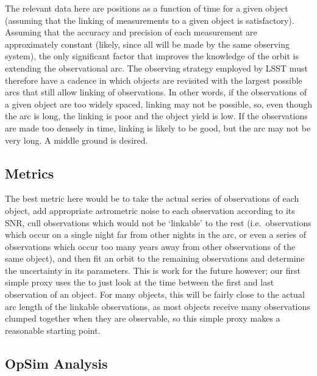 The relevant data here are positions as a function of time for a given
object (assuming that the linking of measurements to a given object is
satisfactory). Assuming that the accuracy and precision of each
measurement are approximately constant (likely, since all will be made
by the same observing system), the only significant factor that improves
the knowledge of the orbit is extending the observational arc. The
observing strategy employed by LSST must therefore have a cadence in
which objects are revisited with the largest possible arcs that still
allow linking of observations. In other words, if the observations of a
given object are too widely spaced, linking may not be possible, so,
even though the arc is long, the linking is poor and the object yield is
low. If the observations are made too densely in time, linking is likely
to be good, but the arc may not be very long. A middle ground is
desired.


\subsection{Metrics}
\label{sec:\secname:metrics}

The best metric here would be to take the actual series of observations
of each object, add appropriate astrometric noise to each observation
according to its SNR, cull observations which would not be `linkable' to
the rest (i.e.\ observations which occur on a single night far from other
nights in the arc, or even a series of observations which occur too many
years away from other observations of the same object), and then fit an
orbit to the remaining observations and determine the uncertainty in its
parameters. This is work for the future however; our first simple proxy
uses the  to just look at the time between the first
and last observation of an object. For many objects, this will be fairly
close to the actual arc length of the linkable observations, as most
objects receive many observations clumped together when they are
observable, so this simple proxy makes a reasonable starting point.



\subsection{OpSim Analysis}
\label{sec:\secname:analysis}

